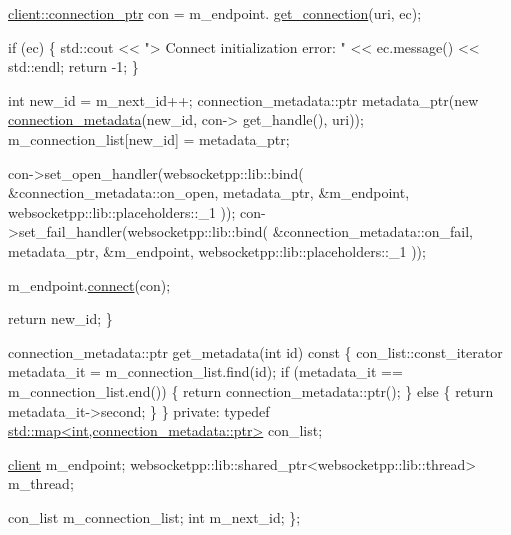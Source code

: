 \begin{DoxyCode}
        \mbox{\hyperlink{classwebsocketpp_1_1client_a2e187bbb2beac676bbfbc2e8065de83e}{client::connection\_ptr}} con = m\_endpoint.
      \mbox{\hyperlink{classwebsocketpp_1_1client_aa95cec974921e32bc37a61c683ae240d}{get\_connection}}(uri, ec);

        \textcolor{keywordflow}{if} (ec) \{
            std::cout << \textcolor{stringliteral}{"> Connect initialization error: "} << ec.message() << std::endl;
            \textcolor{keywordflow}{return} -1;
        \}

        \textcolor{keywordtype}{int} new\_id = m\_next\_id++;
        connection\_metadata::ptr metadata\_ptr(\textcolor{keyword}{new} \mbox{\hyperlink{classconnection__metadata}{connection\_metadata}}(new\_id, con->
      get\_handle(), uri));
        m\_connection\_list[new\_id] = metadata\_ptr;

        con->set\_open\_handler(websocketpp::lib::bind(
            &connection\_metadata::on\_open,
            metadata\_ptr,
            &m\_endpoint,
            websocketpp::lib::placeholders::\_1
        ));
        con->set\_fail\_handler(websocketpp::lib::bind(
            &connection\_metadata::on\_fail,
            metadata\_ptr,
            &m\_endpoint,
            websocketpp::lib::placeholders::\_1
        ));

        m\_endpoint.\mbox{\hyperlink{classwebsocketpp_1_1client_a818c30343180123bf1fee6dc21524bae}{connect}}(con);

        \textcolor{keywordflow}{return} new\_id;
    \}

    connection\_metadata::ptr get\_metadata(\textcolor{keywordtype}{int} \textcolor{keywordtype}{id})\textcolor{keyword}{ const }\{
        con\_list::const\_iterator metadata\_it = m\_connection\_list.find(\textcolor{keywordtype}{id});
        \textcolor{keywordflow}{if} (metadata\_it == m\_connection\_list.end()) \{
            \textcolor{keywordflow}{return} connection\_metadata::ptr();
        \} \textcolor{keywordflow}{else} \{
            \textcolor{keywordflow}{return} metadata\_it->second;
        \}
    \}
\textcolor{keyword}{private}:
    \textcolor{keyword}{typedef} \mbox{\hyperlink{classstd_1_1map}{std::map<int,connection\_metadata::ptr>}} con\_list;

    \mbox{\hyperlink{classwebsocketpp_1_1client}{client}} m\_endpoint;
    websocketpp::lib::shared\_ptr<websocketpp::lib::thread> m\_thread;

    con\_list m\_connection\_list;
    \textcolor{keywordtype}{int} m\_next\_id;
\};


\end{DoxyCode}
